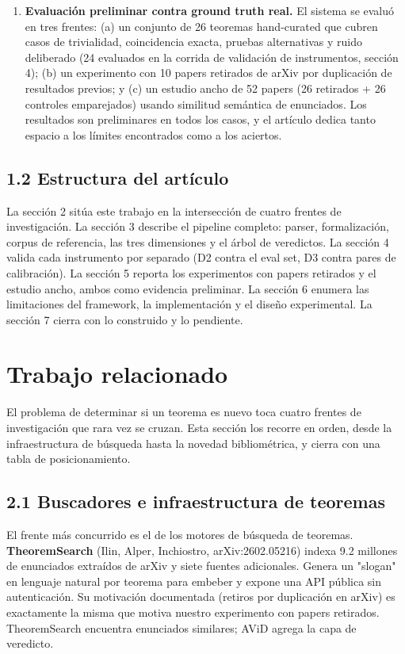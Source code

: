 \documentclass[12pt,a4paper]{article}
\theoremstyle{remark}
\begin{document}
\begin{enumerate}
\item \textbf{Evaluación preliminar contra ground truth real.} El sistema se evaluó en tres frentes: (a) un conjunto de 26 teoremas hand-curated que cubren casos de trivialidad, coincidencia exacta, pruebas alternativas y ruido deliberado (24 evaluados en la corrida de validación de instrumentos, sección 4); (b) un experimento con 10 papers retirados de arXiv por duplicación de resultados previos; y (c) un estudio ancho de 52 papers (26 retirados + 26 controles emparejados) usando similitud semántica de enunciados. Los resultados son preliminares en todos los casos, y el artículo dedica tanto espacio a los límites encontrados como a los aciertos.
\end{enumerate}


\subsection{1.2 Estructura del artículo}

La sección 2 sitúa este trabajo en la intersección de cuatro frentes de investigación. La sección 3 describe el pipeline completo: parser, formalización, corpus de referencia, las tres dimensiones y el árbol de veredictos. La sección 4 valida cada instrumento por separado (D2 contra el eval set, D3 contra pares de calibración). La sección 5 reporta los experimentos con papers retirados y el estudio ancho, ambos como evidencia preliminar. La sección 6 enumera las limitaciones del framework, la implementación y el diseño experimental. La sección 7 cierra con lo construido y lo pendiente.

\section{Trabajo relacionado}

El problema de determinar si un teorema es nuevo toca cuatro frentes de investigación que rara vez se cruzan. Esta sección los recorre en orden, desde la infraestructura de búsqueda hasta la novedad bibliométrica, y cierra con una tabla de posicionamiento.


\subsection{2.1 Buscadores e infraestructura de teoremas}

El frente más concurrido es el de los motores de búsqueda de teoremas. \textbf{TheoremSearch} (Ilin, Alper, Inchiostro, arXiv:2602.05216) indexa 9.2 millones de enunciados extraídos de arXiv y siete fuentes adicionales. Genera un "slogan" en lenguaje natural por teorema para embeber y expone una API pública sin autenticación. Su motivación documentada (retiros por duplicación en arXiv) es exactamente la misma que motiva nuestro experimento con papers retirados. TheoremSearch encuentra enunciados similares; AViD agrega la capa de veredicto.
\end{document}
